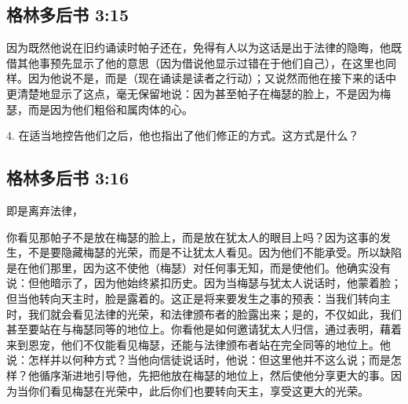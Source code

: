
\subsection{格林多后书 3:15}

\par

因为既然他说在旧约诵读时帕子还在，免得有人以为这话是出于法律的隐晦，他既借其他事预先显示了他的意思（因为借说他显示过错在于他们自己），在这里也同样。因为他说不是，而是（现在诵读是读者之行动）；又说然而他在接下来的话中更清楚地显示了这点，毫无保留地说：因为甚至帕子在梅瑟的脸上，不是因为梅瑟，而是因为他们粗俗和属肉体的心。\par

4. 在适当地控告他们之后，他也指出了他们修正的方式。这方式是什么？\par


\subsection{格林多后书 3:16}

即是离弃法律，\par

你看见那帕子不是放在梅瑟的脸上，而是放在犹太人的眼目上吗？因为这事的发生，不是要隐藏梅瑟的光荣，而是不让犹太人看见。因为他们不能承受。所以缺陷是在他们那里，因为这不使他（梅瑟）对任何事无知，而是使他们。他确实没有说：但他暗示了，因为他始终紧扣历史。因为当梅瑟与犹太人说话时，他蒙着脸；但当他转向天主时，脸是露着的。这正是将来要发生之事的预表：当我们转向主时，我们就会看见法律的光荣，和法律颁布者的脸露出来；是的，不仅如此，我们甚至要站在与梅瑟同等的地位上。你看他是如何邀请犹太人归信，通过表明，藉着来到恩宠，他们不仅能看见梅瑟，还能与法律颁布者站在完全同等的地位上。他说：怎样并以何种方式？当他向信徒说话时，他说：但这里他并不这么说；而是怎样？他循序渐进地引导他，先把他放在梅瑟的地位上，然后使他分享更大的事。因为当你们看见梅瑟在光荣中，此后你们也要转向天主，享受这更大的光荣。\par

